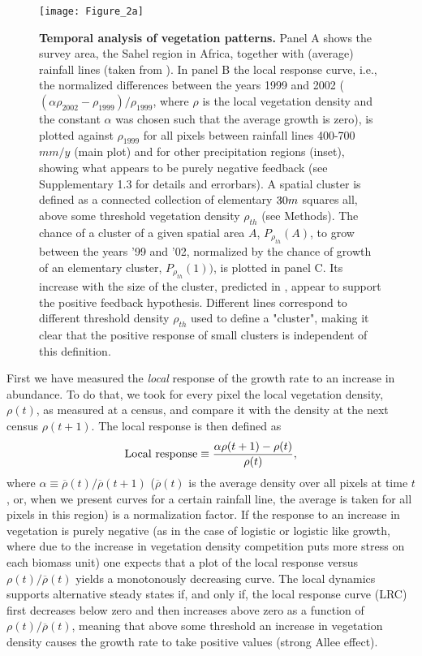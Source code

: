 \documentclass[aps,pre,twocolumn]{revtex4-1}
\begin{document}
\begin{figure*}
\begin{center}
\texttt{[image: Figure\_2a]}
\vspace{-0.cm}
\end{center}
\caption{\textbf{Temporal analysis of vegetation patterns.} Panel A shows the survey area, the Sahel region in Africa, together with (average) rainfall lines (taken from \cite{hijmans2005very}). In panel B the local response curve, i.e., the  normalized differences between the years 1999 and 2002 ($(\alpha \rho_{2002} - \rho_{1999})/\rho_{1999}$, where $\rho$ is the local vegetation density and the constant $\alpha$ was chosen such that the average growth is zero), is plotted against $\rho_{1999}$ for all pixels between rainfall lines 400-700 $mm/y$ (main plot) and for other precipitation regions (inset), showing what appears to be purely negative feedback (see Supplementary 1.3 for details and errorbars). A spatial cluster is defined as a connected collection of elementary $30 \time 30 m$ squares all, above some threshold vegetation density $\rho_{th}$ (see Methods).  The chance of a cluster of a given spatial area $A$, $P_{\rho_{th}}(A)$, to grow between the years '99 and '02, normalized by the chance of growth of an elementary cluster, $P_{\rho_{th}}(1))$, is plotted in panel C.  Its increase with the size of the cluster, predicted in \cite{weissmann2016predicting}, appear to support the positive feedback hypothesis. Different lines correspond to different threshold density $\rho_{th}$ used to define a "cluster", making it clear that the positive response of small clusters is independent of this definition.}
 \label{fig2}
\end{figure*}


 First we have measured the \emph{local} response of the growth rate to an increase in abundance. To do that, we took for every pixel the local vegetation density, $\rho(t)$, as measured at a census, and compare it with the density at the next census $\rho(t+1)$. The local response is then defined as
\begin{equation}
{\rm Local \ response} \equiv \frac{\alpha \rho(t+1)- \rho(t)}{{\rho(t)}},
\end{equation}
where $\alpha \equiv {\overline \rho(t)}/{\overline \rho(t+1)}$ ($\overline \rho(t)$ is the average density over all pixels at time $t$, or, when we present curves for a certain rainfall line, the average is taken for all pixels in this region)  is a normalization factor. If the response to an increase in vegetation is purely negative (as in the case of logistic or logistic like growth, where due to the increase in vegetation density competition puts more stress on each biomass unit) one expects that a plot of the local response versus $\rho(t)/\overline \rho(t)$ yields a monotonously decreasing curve. The local dynamics supports alternative steady states if, and only if, the local response curve (LRC) first decreases below zero and  then increases above zero as a function of  $\rho(t)/\overline \rho(t)$,  meaning that above some threshold an increase in vegetation density causes the growth rate to take positive values (strong Allee effect).
\end{document}

